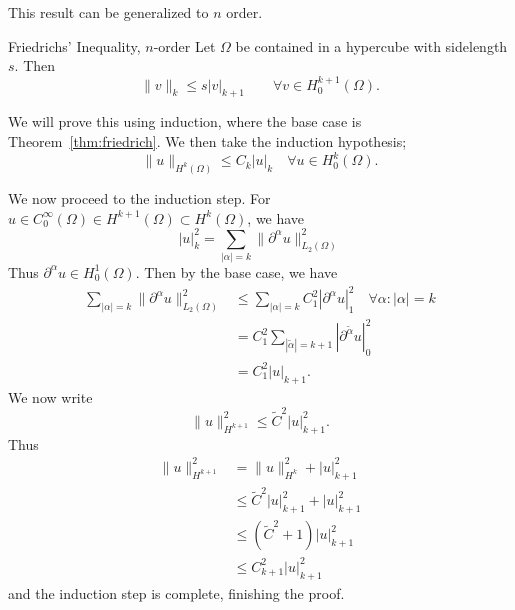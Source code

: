 This result can be generalized to $n$ order. 

\begin{kor}{Friedrichs' Inequality, $n$-order}
    Let $\Omega$ be contained in a hypercube with sidelength $s$. Then 
\begin{equation*}
    \| v \|_{k} \leq s |v|_{k+1} \quad \quad \forall v \in H_0^{k+1}(\Omega).
\end{equation*}\label{cor:friedrich_n}
\vspace{-8mm}
\end{kor}
\begin{bev}
We will prove this using induction, where the base case is Theorem~\ref{thm:friedrich}.
We then take the induction hypothesis;
\begin{equation*}
    \|u\|_{ H^k (\Omega)} \leq C_k |u|_k \quad \forall u \in H_0^k (\Omega).
\end{equation*}

We now proceed to the induction step. For $u\in C^{\infty}_0(\Omega)\in H^{k+1}(\Omega)\subset H^k(\Omega)$, we have
\begin{equation}
    |u|^2_k = \sum_{|\alpha| = k} \|\partial^\alpha u\|_{L_2(\Omega)}^2
\end{equation}
Thus $\partial^\alpha u \in H^1_0(\Omega)$. Then by the base case, we have
\begin{equation}
    \begin{split}
        \sum_{|\alpha|=k} \|\partial^\alpha u\|^2_{L_2(\Omega)} &\leq \sum_{|\alpha|=k} C_1^2 |\partial^\alpha u|_1^2 \quad \forall \alpha : |\alpha|=k \\
        &=  C^2_1 \sum_{|\tilde{\alpha}|=k+1} |\partial^{\tilde{\alpha}} u |^2_0 \\
        &= C_1^2 |u|_{k+1}.
    \end{split}
\end{equation}  
We now write
\begin{equation}
    \|u\|^2_{H^{k+1}} \leq \tilde{C}^2 |u|^2_{k+1}.
\end{equation}
Thus
\begin{align*}
    \|u\|^2_{H^{k+1}} &=\|u\|^2_{H^k} + |u|^2_{k+1} \\
    &\leq \tilde{C}^2|u|^2_{k+1} + |u|^2_{k+1} \\
    &\leq (\tilde{C}^2 + 1)|u|^2_{k+1} \\
    &\leq C_{k+1}^2 |u|^2_{k+1}
\end{align*}
and the induction step is complete, finishing the proof.
\end{bev}